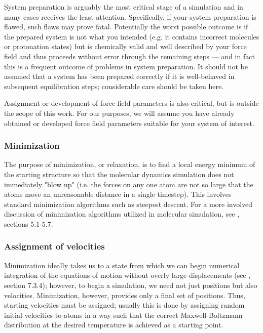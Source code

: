 \documentclass[9pt,bestpractices]{livecoms}
\begin{document}
System preparation is arguably the most critical stage of a simulation and in many cases receives the least attention.
Specifically, if your system preparation is flawed, such flaws may prove fatal.
Potentially the worst possible outcome is if the prepared system is not what you intended (e.g. it contains incorrect molecules or protonation states) but is chemically valid and well described by your force field and thus proceeds without error through the remaining steps --- and in fact this is a  frequent outcome of problems in system preparation.
It should not be assumed that a system has been prepared correctly if it is well-behaved in subsequent equilibration steps; considerable care should be taken here.

Assignment or development of force field parameters is also critical, but is outside the scope of this work.
For our purposes, we will assume you have already obtained or developed force field parameters suitable for your system of interest.

\subsubsection{Minimization}

The purpose of minimization, or relaxation, is to find a local energy minimum of the starting structure so that the molecular dynamics simulation does not immediately "blow up" (i.e. the forces on any one atom are not so large that the atoms move an unreasonable distance in a single timestep).
This involves standard minimization algorithms such as steepest descent.
For a more involved discussion of minimization algorithms utilized in molecular simulation, see \citet{LeachBook}, sections 5.1-5.7.

\subsubsection{Assignment of velocities}
\label{sec:velocities}
Minimization ideally takes us to a state from which we can begin numerical integration of the equations of motion without overly large displacements (see \citet{LeachBook}, section 7.3.4); however, to begin a simulation, we need not just positions but also velocities.
Minimization, however, provides only a final set of positions.
Thus, starting velocities must be assigned; usually this is done by assigning random initial velocities to atoms in a way such that the correct Maxwell-Boltzmann distribution at the desired temperature is achieved as a starting point.
\end{document}
